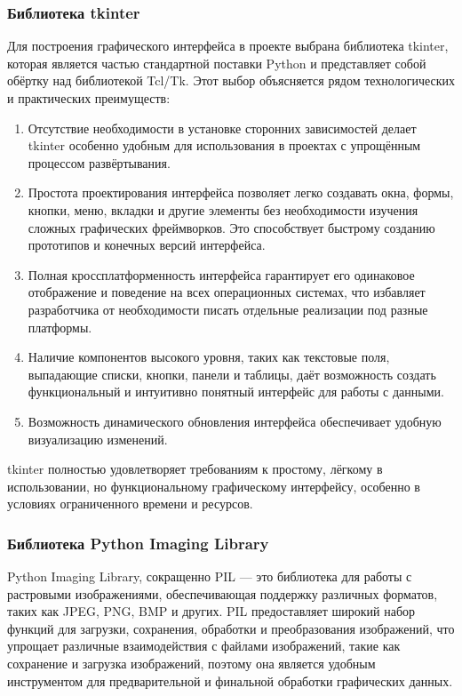 \subsubsection{Библиотека tkinter}

Для построения графического интерфейса в проекте выбрана библиотека tkinter, которая является частью стандартной поставки Python и представляет собой обёртку над библиотекой Tcl/Tk. Этот выбор объясняется рядом технологических и практических преимуществ:
\begin{enumerate}
	\item Отсутствие необходимости в установке сторонних зависимостей делает tkinter особенно удобным для использования в проектах с упрощённым процессом развёртывания. 
	\item Простота проектирования интерфейса позволяет легко создавать окна, формы, кнопки, меню, вкладки и другие элементы без необходимости изучения сложных графических фреймворков. Это способствует быстрому созданию прототипов и конечных версий интерфейса.
	\item Полная кроссплатформенность интерфейса гарантирует его одинаковое отображение и поведение на всех операционных системах, что избавляет разработчика от необходимости писать отдельные реализации под разные платформы.
	\item Наличие компонентов высокого уровня, таких как текстовые поля, выпадающие списки, кнопки, панели и таблицы, даёт возможность создать функциональный и интуитивно понятный интерфейс для работы с данными.
	\item Возможность динамического обновления интерфейса обеспечивает удобную визуализацию изменений.
\end{enumerate}

tkinter полностью удовлетворяет требованиям к простому, лёгкому в использовании, но функциональному графическому интерфейсу, особенно в условиях ограниченного времени и ресурсов.	

\subsubsection{Библиотека Python Imaging Library}

Python Imaging Library, сокращенно PIL — это библиотека для работы с растровыми изображениями, обеспечивающая поддержку различных форматов, таких как JPEG, PNG, BMP и других. PIL предоставляет широкий набор функций для загрузки, сохранения, обработки и преобразования изображений, что упрощает различные взаимодействия с файлами изображений, такие как сохранение и загрузка изображений, поэтому она является удобным инструментом для предварительной и финальной обработки графических данных.


